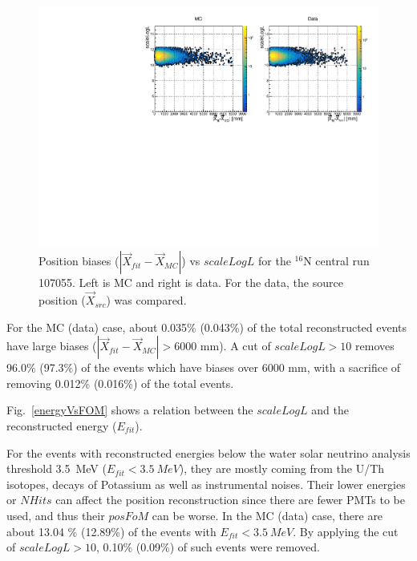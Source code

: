 \begin{figure}
	\centering
		\includegraphics[width=13cm]{N16_107055_scaleLogLvsPosBias.pdf}
	\caption[Position biases ($|\vec{X}_{fit}-\vec{X}_{MC}|$) vs $scaleLogL$ for the $^{16}$N central run 107055.]{Position biases ($|\vec{X}_{fit}-\vec{X}_{MC}|$) vs $scaleLogL$ for the $^{16}$N central run 107055. Left is MC and right is data. For the data, the source position ($\vec{X}_{src}$) was compared.}
	\label{posBiasVsFOM}
\end{figure}

For the MC (data) case, about 0.035\% (0.043\%) of the total reconstructed events have large biases ($|\vec{X}_{fit}-\vec{X}_{MC}|>6000$ mm). A cut of $scaleLogL>10$ removes 96.0\% (97.3\%) of the events which have biases over 6000 mm, with a sacrifice of removing 0.012\% (0.016\%) of the total events.

Fig.~\ref{energyVsFOM} shows a relation between the $scaleLogL$ and the reconstructed energy ($E_{fit}$). 

For the events with reconstructed energies below the water solar neutrino analysis threshold 3.5~MeV ($E_{fit}<3.5~MeV$), they are mostly coming from the U/Th isotopes, decays of Potassium as well as instrumental noises\cite{waterunidoc}. Their lower energies or $NHits$ can affect the position reconstruction since there are fewer PMTs to be used, and thus their $posFoM$ can be worse.
In the MC (data) case, there are about 13.04 \% (12.89\%) of the events with $E_{fit}<3.5~MeV$. By applying the cut of $scaleLogL>10$, 0.10\% (0.09\%) of such events were removed.

